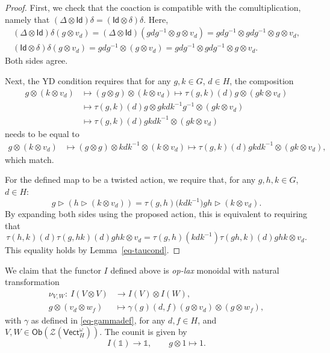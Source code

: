 \documentclass[10pt,a4paper]{amsart}
\numberwithin{equation}{section}
\newcommand{\ide}{\mathsf{Id}}
\newcommand{\Ob}{\mathsf{Ob}}
\newcommand{\one}{\mathds{1}}
\newcommand{\Vect}{\mathsf{Vect}}
\newcommand{\cZ}{\mathcal{Z}}
\newcommand{\rI}{I}
\begin{document}
\begin{proof}
First, we check that the coaction is compatible with the comultiplication, namely that $ ( \Delta \otimes \ide ) \delta = (\ide \otimes \delta ) \delta$. Here,{\samepage
 \begin{gather*}
 ( \Delta \otimes \ide ) \delta ( g \otimes v_d ) = ( \Delta \otimes \ide ) ( gdg^{-1} \otimes g \otimes v_d ) = gdg^{-1} \otimes gdg^{-1} \otimes g \otimes v_d, \\
 ( \ide \otimes \delta ) \delta ( g \otimes v_d ) = gdg^{-1} \otimes ( g \otimes v_d ) = gdg^{-1} \otimes gdg^{-1} \otimes g \otimes v_d.
 \end{gather*}
Both sides agree.}

Next, the YD condition requires that for any $g, k \in G$, $d \in H$, the composition
 \begin{align*}
 g \otimes ( k \otimes v_d ) & \mapsto ( g \otimes g ) \otimes ( k \otimes v_d )\mapsto \tau ( g,k ) ( d ) g \otimes ( gk \otimes v_d ) \\ & \mapsto \tau ( g,k ) ( d ) g \otimes gkdk^{-1}g^{-1} \otimes ( gk \otimes v_d )
 \\&\mapsto \tau ( g,k ) ( d ) gkdk^{-1} \otimes ( gk \otimes v_d )
 \end{align*}
 needs to be equal to
 \begin{align*}
 g \otimes ( k \otimes v_d ) & \mapsto ( g \otimes g ) \otimes kdk^{-1} \otimes ( k \otimes v_d ) \mapsto \tau ( g,k ) ( d ) gkdk^{-1} \otimes ( gk \otimes v_d ),
 \end{align*}
which match.

For the defined map to be a twisted action, we require that, for any $ g,h,k \in G$, $d \in H$:
 \begin{equation*}
 g \vartriangleright (h \vartriangleright ( k \otimes v_d )) = \tau(g,h)\big(kdk^{-1}\big) gh \vartriangleright (k \otimes v_d ).
 \end{equation*}
By expanding both sides using the proposed action, this is equivalent to requiring that
 \begin{equation*}
 \tau(h,k)(d)\tau(g,hk)(d)ghk \otimes v_d = \tau(g,h)(kdk^{-1})\tau(gh,k)(d)ghk \otimes v_d.
 \end{equation*}
This equality holds by Lemma~\ref{eq-taucond}.
\end{proof}

We claim that the functor $I$ defined above is \emph{op-lax} monoidal with natural transformation
\begin{align*}
 \nu_{V,W} \colon\ \rI ( V \otimes V ) & \to \rI ( V ) \otimes \rI ( W ), \nonumber \\
 g \otimes ( v_d \otimes w_f ) & \mapsto \gamma ( g ) ( d,f ) ( g \otimes v_d ) \otimes ( g \otimes w_f ),
\end{align*}
with $\gamma$ as defined in \eqref{eq-gammadef}, for any $d,f \in H$, and $V,W \in \Ob ( \cZ( \Vect_H^\omega))$. The counit is given by
\begin{equation*}
 \rI(\one)\to \one, \qquad g\otimes 1\mapsto 1.
\end{equation*}
\end{document}
